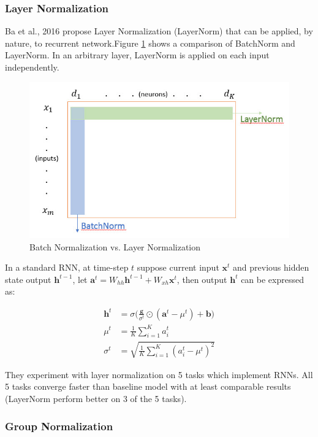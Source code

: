 \documentclass{article}
\begin{document}
\subsubsection{Layer Normalization}

Ba et al., 2016 propose Layer Normalization (LayerNorm) that can be applied, by nature, to recurrent network.Figure \ref{fig:batchvslayernorm} shows a comparison of BatchNorm and LayerNorm.  In an arbitrary layer, LayerNorm is applied on each input independently. 

\begin{figure}[!ht]
	\centering
    \includegraphics[scale=0.7]{pics/batchNorm/BatchNorm_vs_LayerNorm.jpg}
	\caption{Batch Normalization vs. Layer Normalization}
	\label{fig:batchvslayernorm}
\end{figure}

In a standard RNN, at time-step $t$ suppose current input $\textbf{x}^t$ and previous hidden state output $\textbf{h}^{t-1}$, let $\textbf{a}^t = W_{hh}\textbf{h}^{t-1}+W_{xh}\textbf{x}^t$, then output $\textbf{h}^t$ can be expressed as:

\begin{align*}
    \textbf{h}^t&=\sigma\Big(\frac{\textbf{g}}{\sigma^t}\odot(\textbf{a}^t - \mu^t) + \textbf{b}\Big)\\
    \mu^t&=\frac{1}{K}\sum_{i=1}^Ka_i^t\\
    \sigma^t&=\sqrt{\frac{1}{K}\sum_{i=1}^K(a_i^t-\mu^t)^2}
\end{align*}

They experiment with layer normalization on 5 tasks which implement RNNs. All 5 tasks converge faster than baseline model with at least comparable results (LayerNorm perform better on 3 of the 5 tasks).

\subsubsection{Group Normalization}
\end{document}
